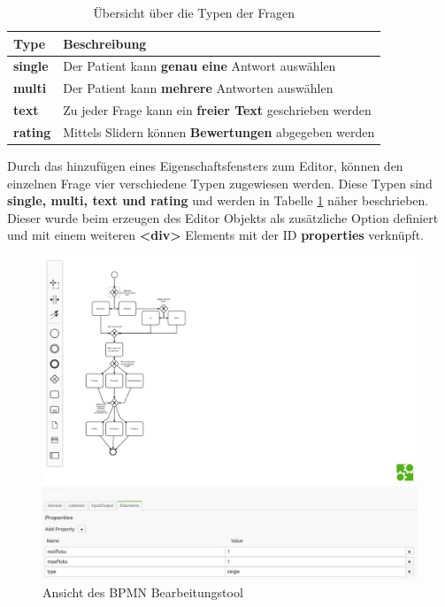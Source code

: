 \begin{table}[H]
	\begin{center}
		\begin{tabular}{p{4cm} p{10cm}}
		\rowcolor{black!20} \textbf{Type} &  \textbf{Beschreibung} \\ \toprule
		\textbf{single}		& Der Patient kann \textbf{genau eine} Antwort auswählen  \\ \hline \addlinespace
		\textbf{multi}		& Der Patient kann \textbf{mehrere} Antworten auswählen   \\ \hline \addlinespace
		\textbf{text}		& Zu jeder Frage kann ein \textbf{freier Text} geschrieben werden  \\ \hline \addlinespace
		\textbf{rating}		& Mittels Slidern können \textbf{Bewertungen} abgegeben werden                                    
		\end{tabular}
	\end{center}
	\caption{Übersicht über die Typen der Fragen}
	\label{FrageTypen}
\end{table}

Durch das hinzufügen eines Eigenschaftsfensters zum Editor, können den einzelnen Frage vier verschiedene Typen zugewiesen werden. Diese Typen sind \textbf{single, multi, text und rating} und werden in Tabelle \ref{FrageTypen} näher beschrieben. Dieser wurde beim erzeugen des Editor Objekts als zusätzliche Option definiert und mit einem weiteren \textbf{<div>} Elements mit der ID \textbf{properties} verknüpft.

\begin{figure}[H]
	\centering
	\includegraphics[scale=0.37]{images/Screenshots/BPMNModeller}
	\caption[Ansicht des BPMN Bearbeitungstool]{Ansicht des BPMN Bearbeitungstool}
	\label{BPMNModeller}
\end{figure}

